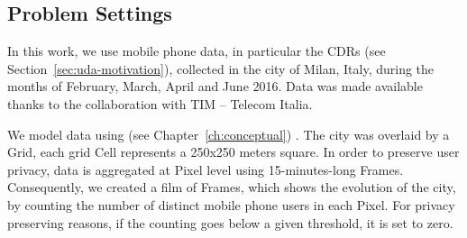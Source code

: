 {\subsection{Problem Settings}\label{sec:comp-mod-eval-cost-prob}
\label{sec:desc}


In this work, we use mobile phone data, in particular the CDRs (see Section~\ref{sec:uda-motivation}), collected in the city of Milan, Italy, during the months of February, March, April and June 2016. Data was made available thanks to the collaboration with TIM -- Telecom Italia.

We model data using \frappe{} (see Chapter~\ref{ch:conceptual}) .
The city was overlaid by a \textsf{Grid}, each grid \textsf{Cell} represents a 250x250 meters square. 
In order to preserve user privacy, data is aggregated at \textsf{Pixel} level using 15-minutes-long \textsf{Frame}s.
Consequently, we created a film of \textsf{Frame}s, which shows the evolution of the city, by counting the number of distinct mobile phone users in each \textsf{Pixel}. For privacy preserving reasons, if the counting goes below a given threshold, it is set to zero.

}
